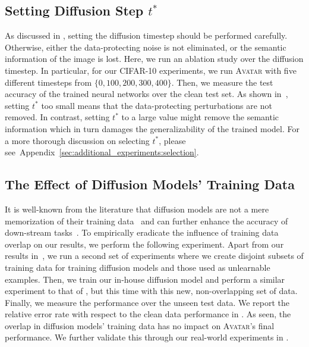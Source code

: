 \documentclass[conference]{IEEEtran}
\theoremstyle{definition}
\theoremstyle{remark}
\theoremstyle{proposition}
\begin{document}
\subsection{Setting Diffusion Step $t^{*}$}
As discussed in , setting the diffusion timestep should be performed carefully.
Otherwise, either the data-protecting noise is not eliminated, or the semantic information of the image is lost.
Here, we run an ablation study over the diffusion timestep.
In particular, for our CIFAR-10 experiments, we run \textsc{Avatar} with five different timesteps from ${\{0, 100, 200, 300, 400\}}$.
Then, we measure the test accuracy of the trained neural networks over the clean test set.
As shown in~, setting $t^{*}$ too small means that the data-protecting perturbations are not removed.
In contrast, setting $t^{*}$ to a large value might remove the semantic information which in turn damages the generalizability of the trained model.
For a more thorough discussion on selecting $t^{*}$, please see~Appendix~\ref{sec:additional_experiments:selection}.

\subsection{The Effect of Diffusion Models' Training Data}\label{sec:sec:training_data}
It is well-known from the literature that diffusion models are not a mere memorization of their training data~\citep{song2021scoresde} and can further enhance the accuracy of down-stream tasks~\citep{azizi2023imagenet, wang2023better}.
To empirically eradicate the influence of training data overlap on our results, we perform the following experiment.
Apart from our results in~, we run a second set of experiments where we create disjoint subsets of training data for training diffusion models and those used as unlearnable examples.
Then, we train our in-house diffusion model and perform a similar experiment to that of , but this time with this new, non-overlapping set of data.
Finally, we measure the performance over the unseen test data.
We report the relative error rate with respect to the clean data performance in .
As seen, the overlap in diffusion models' training data has no impact on \textsc{Avatar}'s final performance.
We further validate this through our real-world experiments in .
\end{document}
